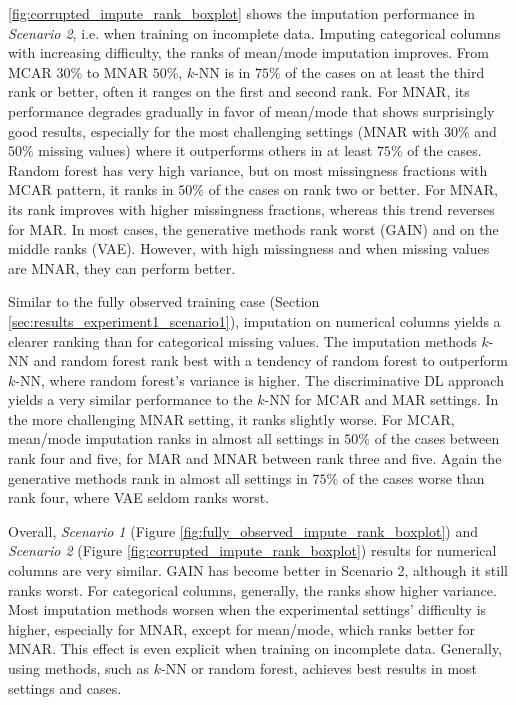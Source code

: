 \documentclass[utf8]{frontiersSCNS} %
\begin{document}
\autoref{fig:corrupted_impute_rank_boxplot} shows the imputation performance in \textit{Scenario 2}, i.e. when training on incomplete data. Imputing categorical columns with increasing difficulty, the ranks of mean/mode imputation improves. From MCAR $30\%$ to MNAR $50\%$, $k$-NN is in $75\%$ of the cases on at least the third rank or better, often it ranges on the first and second rank. For MNAR, its performance degrades gradually in favor of mean/mode that shows surprisingly good results, especially for the most challenging settings (MNAR with $30\%$ and $50\%$ missing values) where it outperforms others in at least $75\%$ of the cases. Random forest has very high variance, but on most missingness fractions with MCAR pattern, it ranks in $50\%$ of the cases on rank two or better. For MNAR, its rank improves with higher missingness fractions, whereas this trend reverses for MAR. In most cases, the generative methods rank worst (GAIN) and on the middle ranks (VAE). However, with high missingness and when missing values are MNAR, they can perform better.

Similar to the fully observed training case (Section \ref{sec:results_experiment1_scenario1}), imputation on numerical columns yields a clearer ranking than for categorical missing values. The imputation methods $k$-NN and random forest rank best with a tendency of random forest to outperform $k$-NN, where random forest's variance is higher. The discriminative DL approach yields a very similar performance to the $k$-NN for MCAR and MAR settings. In the more challenging MNAR setting, it ranks slightly worse. For MCAR, mean/mode imputation ranks in almost all settings in $50\%$ of the cases between rank four and five, for MAR and MNAR between rank three and five. Again the generative methods rank in almost all settings in $75\%$ of the cases worse than rank four, where VAE seldom ranks worst.

Overall, \textit{Scenario 1} (Figure \ref{fig:fully_observed_impute_rank_boxplot}) and \textit{Scenario 2} (Figure \ref{fig:corrupted_impute_rank_boxplot}) results for numerical columns are very similar. GAIN has become better in Scenario 2, although it still ranks worst. For categorical columns, generally, the ranks show higher variance. Most imputation methods worsen when the experimental settings' difficulty is higher, especially for MNAR, except for mean/mode, which ranks better for MNAR. This effect is even explicit when training on incomplete data. Generally, using methods, such as $k$-NN or random forest, achieves best results in most settings and cases.
\end{document}
